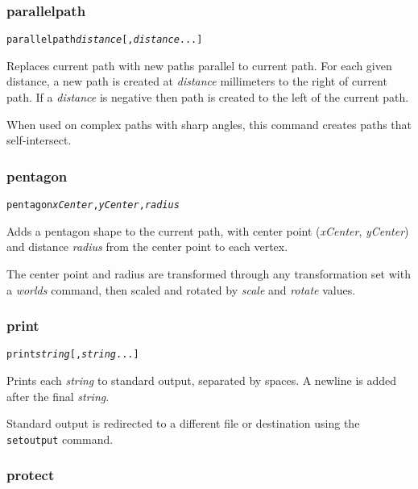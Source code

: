 \subsubsection{parallelpath}

\begin{alltt}
parallelpath \textit{distance} [, \textit{distance} ...]
\end{alltt}

Replaces current path with new paths parallel to current path.
For each given distance, a new path is created at \textit{distance}
millimeters to the right of current path.  If a \textit{distance} is
negative then path is created to the left of the current path.

When used on complex paths with sharp angles, this command creates
paths that self-intersect.

\subsubsection{pentagon}

\begin{alltt}
pentagon \textit{xCenter}, \textit{yCenter}, \textit{radius}
\end{alltt}

Adds a pentagon shape to the current path, with center
point (\textit{xCenter}, \textit{yCenter}) and distance
\textit{radius}
from the center point to each vertex.

The center point and radius are transformed through any
transformation set with a \textit{worlds} command,
then scaled and rotated by \textit{scale}
and \textit{rotate} values.

\subsubsection{print}

\begin{alltt}
print \textit{string} [, \textit{string} ...]
\end{alltt}

Prints each \textit{string} to standard output,
separated by spaces.
A newline is added after the final \textit{string}.

Standard output is redirected to a different file
or destination using the \texttt{setoutput} command.

\subsubsection{protect}


